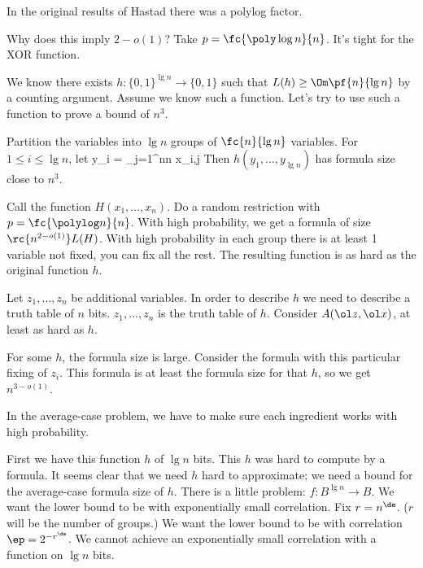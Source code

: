 
In the original results of Hastad there was a polylog factor.

Why does this imply $2-o(1)$? Take $p=\fc{\poly\log n}{n}$.
It's tight for the XOR function. 


We know there exists $h:\{0,1\}^{\lg n}\to \{0,1\}$ such that $L(h)\ge \Om\pf{n}{\lg n}$ by a counting argument. Assume we know such a function. Let's try to use such a function to prove a bound of $n^3$.

Partition the variables into $\lg n$ groups of $\fc{n}{\lg n}$ variables. For $1\le i\le \lg n$, let
y_i = \bigopl_{j=1}^{\fc n{\lg n}} x_{i,j}
\eeq
Then $h(y_1,\ldots, y_{\lg n})$ has formula size close to $n^3$. 

Call the function $H(x_1,\ldots, x_n)$. Do a random restriction with $p=\fc{\polylog n}{n}$. With high probability, we get a formula of size $\rc{n^{2-o(1)}}L(H)$. With high probability in each group there is at least 1 variable not fixed, you can fix all the rest. The resulting function is as hard as the original function $h$.


Let $z_1,\ldots, z_n$ be additional variables.
In order to describe $h$ we need to describe a truth table of $n$ bits. $z_1,\ldots, z_n$ is the truth table of $h$. %
Consider $A(\ol z,\ol x)$, at least as hard as $h$.



For some $h$, the formula size is large. Consider the formula with this particular fixing of $z_i$. This formula is at least the formula size for that $h$, so we get $n^{3-o(1)}$.

In the average-case problem, we have to make sure each ingredient works with high probability.

First we have this function $h$ of $\lg n$ bits. This $h$ was hard to compute by a formula. It seems clear that we need $h$ hard to approximate; we need a bound for the average-case formula size of $h$. There is a little problem: $f:B^{\lg n}\to B$. We want the lower bound to be with exponentially small correlation. Fix $r=n^{\de}$. ($r$ will be the number of groups.) We want the lower bound to be with correlation $\ep=2^{-r^{\de}}$. We cannot achieve an exponentially small correlation with a function on $\lg n$ bits.

